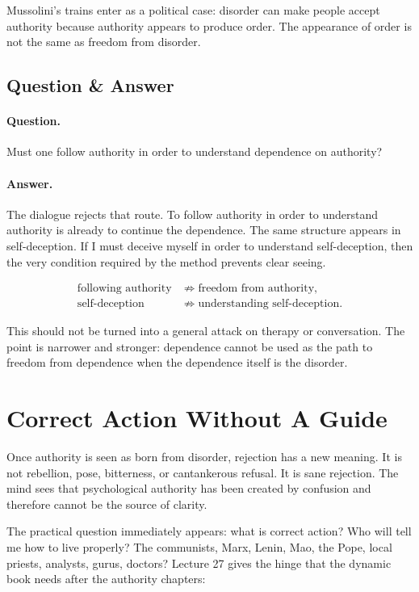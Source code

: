 \documentclass[11pt,oneside]{book}
\begin{document}
Mussolini's trains enter as a political case: disorder can make people accept authority because authority appears to produce order. The appearance of order is not the same as freedom from disorder.

\subsection{Question \& Answer}

\paragraph{Question.}
Must one follow authority in order to understand dependence on authority?

\paragraph{Answer.}
The dialogue rejects that route. To follow authority in order to understand authority is already to continue the dependence. The same structure appears in self-deception. If I must deceive myself in order to understand self-deception, then the very condition required by the method prevents clear seeing.

\begin{align}
\text{following authority}
&\not\Rightarrow
\text{freedom from authority},\\
\text{self-deception}
&\not\Rightarrow
\text{understanding self-deception}.
\end{align}

This should not be turned into a general attack on therapy or conversation. The point is narrower and stronger: dependence cannot be used as the path to freedom from dependence when the dependence itself is the disorder.

\section{Correct Action Without A Guide}

Once authority is seen as born from disorder, rejection has a new meaning. It is not rebellion, pose, bitterness, or cantankerous refusal. It is sane rejection. The mind sees that psychological authority has been created by confusion and therefore cannot be the source of clarity.

The practical question immediately appears: what is correct action? Who will tell me how to live properly? The communists, Marx, Lenin, Mao, the Pope, local priests, analysts, gurus, doctors? Lecture 27 gives the hinge that the dynamic book needs after the authority chapters:
\end{document}
